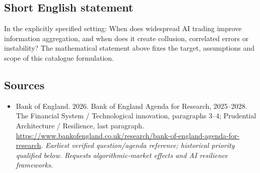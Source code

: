 \documentclass[11pt]{article}
\begin{document}
\subsection{Short English statement}
In the explicitly specified setting: When does widespread AI trading improve information aggregation, and when does it create collusion, correlated errors or instability? The mathematical statement above fixes the target, assumptions and scope of this catalogue formulation.

\subsection{Sources}
\begin{itemize}\raggedright
\item[\textnormal{[S1]}]\hypertarget{source:30007601:1}{} Bank of England. 2026. Bank of England Agenda for Research, 2025–2028. The Financial System / Technological innovation, paragraphs 3–4; Prudential Architecture / Resilience, last paragraph.
\url{https://www.bankofengland.co.uk/research/bank-of-england-agenda-for-research}.
{\small\textit{Earliest verified question/agenda reference; historical priority qualified below. Requests algorithmic-market effects and AI resilience frameworks.}}
\end{itemize}
\end{document}

